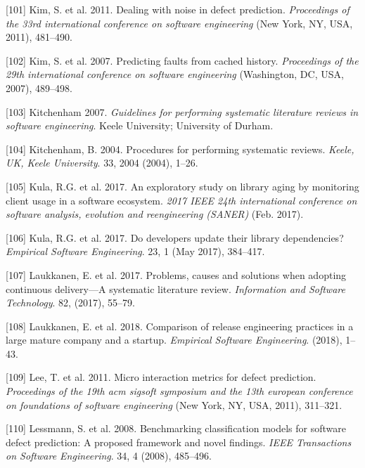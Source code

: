 \documentclass[]{book}
\begin{document}
\hypertarget{ref-Kim2011}{}
{[}101{]} Kim, S. et al. 2011. Dealing with noise in defect prediction.
\emph{Proceedings of the 33rd international conference on software
engineering} (New York, NY, USA, 2011), 481--490.

\hypertarget{ref-kim2007}{}
{[}102{]} Kim, S. et al. 2007. Predicting faults from cached history.
\emph{Proceedings of the 29th international conference on software
engineering} (Washington, DC, USA, 2007), 489--498.

\hypertarget{ref-kitchenham2007}{}
{[}103{]} Kitchenham 2007. \emph{Guidelines for performing systematic
literature reviews in software engineering}. Keele University;
University of Durham.

\hypertarget{ref-kitchenham2004procedures}{}
{[}104{]} Kitchenham, B. 2004. Procedures for performing systematic
reviews. \emph{Keele, UK, Keele University}. 33, 2004 (2004), 1--26.

\hypertarget{ref-Kula2017-2}{}
{[}105{]} Kula, R.G. et al. 2017. An exploratory study on library aging
by monitoring client usage in a software ecosystem. \emph{2017 IEEE 24th
international conference on software analysis, evolution and
reengineering (SANER)} (Feb. 2017).

\hypertarget{ref-Kula2017}{}
{[}106{]} Kula, R.G. et al. 2017. Do developers update their library
dependencies? \emph{Empirical Software Engineering}. 23, 1 (May 2017),
384--417.

\hypertarget{ref-laukkanen2017a}{}
{[}107{]} Laukkanen, E. et al. 2017. Problems, causes and solutions when
adopting continuous delivery---A systematic literature review.
\emph{Information and Software Technology}. 82, (2017), 55--79.

\hypertarget{ref-laukkanen2018a}{}
{[}108{]} Laukkanen, E. et al. 2018. Comparison of release engineering
practices in a large mature company and a startup. \emph{Empirical
Software Engineering}. (2018), 1--43.

\hypertarget{ref-Lee2011}{}
{[}109{]} Lee, T. et al. 2011. Micro interaction metrics for defect
prediction. \emph{Proceedings of the 19th acm sigsoft symposium and the
13th european conference on foundations of software engineering} (New
York, NY, USA, 2011), 311--321.

\hypertarget{ref-Lessman2008}{}
{[}110{]} Lessmann, S. et al. 2008. Benchmarking classification models
for software defect prediction: A proposed framework and novel findings.
\emph{IEEE Transactions on Software Engineering}. 34, 4 (2008),
485--496.
\end{document}
